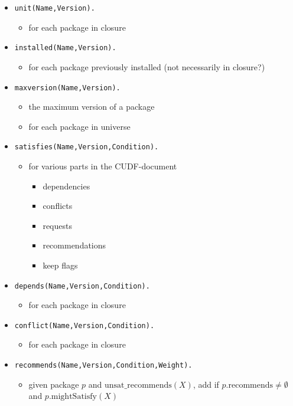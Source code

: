 \documentclass[a4paper,english]{article}
\begin{document}
\begin{itemize}
  \item \texttt{unit(Name,Version).}
    \begin{itemize}
      \item for each package in closure
    \end{itemize}
  \item \texttt{installed(Name,Version).}
    \begin{itemize}
      \item for each package previously installed (not necessarily in closure?)
    \end{itemize}
  \item \texttt{maxversion(Name,Version).}
    \begin{itemize}
      \item the maximum version of a package
      \item for each package in universe
    \end{itemize}
  \item \texttt{satisfies(Name,Version,Condition).}
    \begin{itemize}
      \item for various parts in the CUDF-document
        \begin{itemize}
          \item dependencies
          \item conflicts
          \item requests
          \item recommendations
          \item keep flags
        \end{itemize}
    \end{itemize}
  \item \texttt{depends(Name,Version,Condition).}
    \begin{itemize}
      \item for each package in closure
    \end{itemize}
  \item \texttt{conflict(Name,Version,Condition).}
    \begin{itemize}
      \item for each package in closure
    \end{itemize}
  \item \texttt{recommends(Name,Version,Condition,Weight).}
    \begin{itemize}
      \item given package $p$ and $\mathrm{unsat\_recommends}(X)$, add if $p.\mathrm{recommends}\not=\emptyset$ and $p.\mathrm{mightSatisfy}(X)$

\end{itemize}
\end{itemize}
\end{document}
